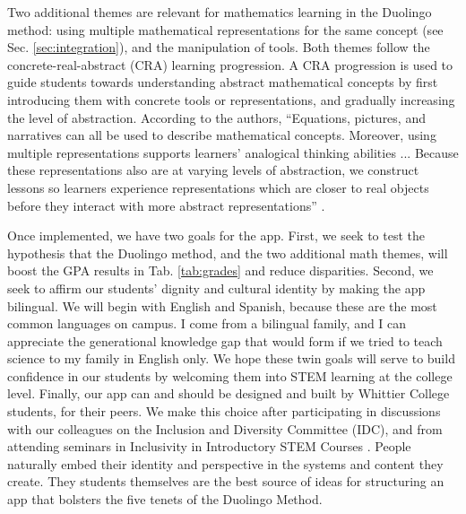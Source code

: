 \documentclass[../../main.tex]{subfiles}
\begin{document}
Two additional themes are relevant for mathematics learning in the Duolingo method: using multiple mathematical representations for the same concept (see Sec. \ref{sec:integration}), and the manipulation of tools.  Both themes follow the concrete-real-abstract (CRA) learning progression.  A CRA progression is used to guide students towards understanding abstract mathematical concepts by first introducing them with concrete tools or representations, and gradually increasing the level of abstraction.  According to the authors, ``Equations, pictures, and narratives can all be used to describe mathematical concepts.  Moreover, using multiple representations supports learners' analogical thinking abilities ... Because these representations also are at varying levels of abstraction, we construct lessons so learners experience representations which are closer to real objects before they interact with more abstract representations'' \cite{duolingo_whitepaper}. \\ \vspace{2.5mm}

Once implemented, we have two goals for the app.  First, we seek to test the hypothesis that the Duolingo method, and the two additional math themes, will boost the GPA results in Tab. \ref{tab:grades} and reduce disparities.  Second, we seek to affirm our students' dignity and cultural identity by making the app bilingual.  We will begin with English and Spanish, because these are the most common languages on campus.  I come from a bilingual family, and I can appreciate the generational knowledge gap that would form if we tried to teach science to my family in English only.  We hope these twin goals will serve to build confidence in our students by welcoming them into STEM learning at the college level.  Finally, our app can and should be designed and built by Whittier College students, for their peers.  We make this choice after participating in discussions with our colleagues on the Inclusion and Diversity Committee (IDC), and from attending seminars in Inclusivity in Introductory STEM Courses \cite{cottrell1,cottrell2}.  People naturally embed their identity and perspective in the systems and content they create.  They students themselves are the best source of ideas for structuring an app that bolsters the five tenets of the Duolingo Method.  \\ \vspace{2.5mm}
\end{document}
